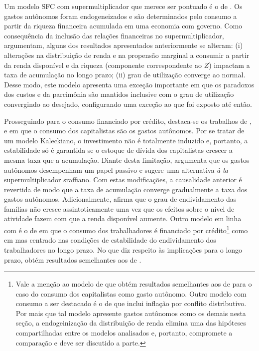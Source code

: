 Um modelo SFC com supermultiplicador que merece ser pontuado é o de \textcite{brochier_supermultiplier_2018}. Os gastos autônomos foram endogeneizados e são determinados pelo consumo a partir da riqueza financeira acumulada em uma economia com governo. Como consequência da inclusão das relações financeiras no supermultiplicador, argumentam, alguns dos resultados apresentados anteriormente se alteram: (i) alterações na distribuição de renda e na propensão marginal a consumir a partir da renda disponível e da riqueza (componente correspondente ao $Z$) impactam a taxa de acumulação no longo prazo; (ii) grau de utilização converge ao normal. Desse modo, este modelo apresenta uma exceção importante em que os paradoxos dos custos e da parcimônia são mantidos inclusive com o grau de utilização convergindo ao desejado, configurando uma exceção ao que foi exposto até então.

Prosseguindo para o consumo financiado por crédito, destaca-se os trabalhos de \textcite{dutt_maturity_2006}, \textcite{palley_inside_2010} e \textcite{hein_finance-dominated_2012} em que o consumo dos capitalistas são os gastos autônomos. Por se tratar de um modelo Kaleckiano, o investimento não é totalmente induzido e, portanto, a estabilidade só é garantida se o estoque de dívida dos capitalistas crescer a mesma taxa que a acumulação. Diante desta limitação, \textcite{pariboni_household_2016} argumenta que os gastos autônomos desempenham um papel passivo e sugere uma alternativa \textit{à la} supermultiplicador sraffiano. Com estas modificações, a causalidade anterior é revertida de modo que a taxa de acumulação converge gradualmente a taxa dos gastos autônomos. Adicionalmente, afirma que o grau de endividamento das famílias não cresce assintoticamente uma vez que os efeitos sobre o nível de atividade fazem com que a renda disponível aumente. 
Outro modelo em linha com \textcite{brochier_supermultiplier_2018} é o de \textcite{mandarino_financing_2018} em que o consumo dos trabalhadores é financiado por crédito\footnote{%
Vale a menção ao modelo de \textcite{lavoie_convergence_2016} que obtém resultados semelhantes aos de \textcite{allain_macroeconomic_2014} para o caso do consumo dos capitalistas como gasto autônomo. Outro modelo com consumo a ser destacado é o de \textcite{nah_role_2019} %
que inclui inflação por conflito distributivo. Por mais que tal modelo apresente gastos autônomos como os demais nesta seção, a endogeinização da distribuição de renda elimina uma das hipóteses compartilhadas entre os modelos analisados e, portanto, compromete a comparação e deve ser discutido a parte.} como em \textcite{fagundes_dinamica_2017} mas centrado nas condições de estabilidade do endividamento dos trabalhadores no longo prazo. No que diz respeito às implicações para o longo prazo, obtém resultados semelhantes aos de \textcite{allain_tackling_2015}.


